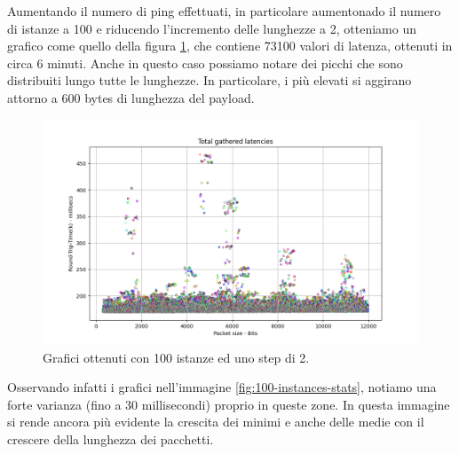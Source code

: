 \FloatBarrier\noindent Aumentando il numero di ping effettuati, in particolare aumentonado il numero di istanze a 100 e riducendo l'incremento delle lunghezze a 2, otteniamo un grafico come quello della figura \ref{fig:100-instances-total}, che contiene 73100 valori di latenza, ottenuti in circa 6 minuti. Anche in questo caso possiamo notare dei picchi che sono distribuiti lungo tutte le lunghezze. In particolare, i più elevati si aggirano attorno a 600 bytes di lunghezza del payload. 
\begin{figure}[h]
    \centering
    \includegraphics[width = .9\textwidth]{hw-2/report/imgs/100-instances/la-total-latencies.png}
    \caption{Grafici ottenuti con 100 istanze ed uno step di 2.}
    \label{fig:100-instances-total}
\end{figure}
Osservando infatti i grafici nell'immagine \ref{fig:100-instances-stats}, notiamo una forte varianza (fino a 30 millisecondi) proprio in queste zone. In questa immagine si rende ancora più evidente la crescita dei minimi e anche delle medie con il crescere della lunghezza dei pacchetti.
